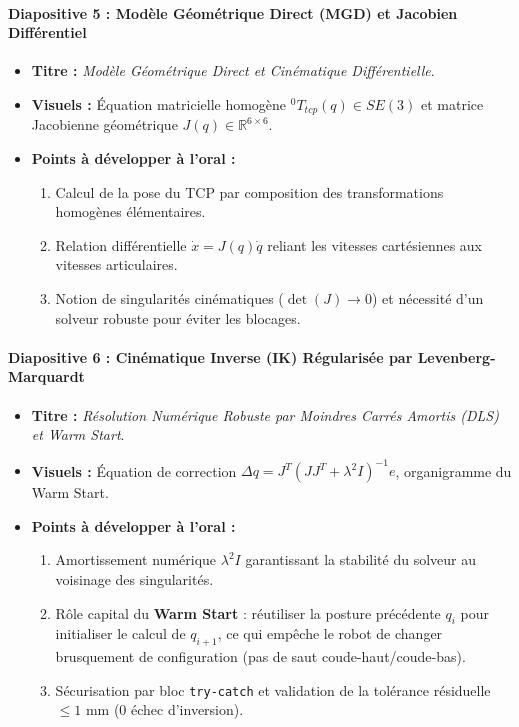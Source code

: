 \documentclass[11pt,a4paper]{report}
\begin{document}
\paragraph{Diapositive 5 : Modèle Géométrique Direct (MGD) et Jacobien Différentiel}
\begin{itemize}
    \item \textbf{Titre :} \textit{Modèle Géométrique Direct et Cinématique Différentielle}.
    \item \textbf{Visuels :} Équation matricielle homogène $^{0}T_{tcp}(q) \in SE(3)$ et matrice Jacobienne géométrique $J(q) \in \mathbb{R}^{6 \times 6}$.
    \item \textbf{Points à développer à l'oral :}
    \begin{enumerate}
        \item Calcul de la pose du TCP par composition des transformations homogènes élémentaires.
        \item Relation différentielle $\dot{x} = J(q) \dot{q}$ reliant les vitesses cartésiennes aux vitesses articulaires.
        \item Notion de singularités cinématiques ($\det(J) \to 0$) et nécessité d'un solveur robuste pour éviter les blocages.
    \end{enumerate}
\end{itemize}

\paragraph{Diapositive 6 : Cinématique Inverse (IK) Régularisée par Levenberg-Marquardt}
\begin{itemize}
    \item \textbf{Titre :} \textit{Résolution Numérique Robuste par Moindres Carrés Amortis (DLS) et Warm Start}.
    \item \textbf{Visuels :} Équation de correction $\Delta q = J^T(JJ^T + \lambda^2 I)^{-1} e$, organigramme du Warm Start.
    \item \textbf{Points à développer à l'oral :}
    \begin{enumerate}
        \item Amortissement numérique $\lambda^2 I$ garantissant la stabilité du solveur au voisinage des singularités.
        \item Rôle capital du \textbf{Warm Start} : réutiliser la posture précédente $q_i$ pour initialiser le calcul de $q_{i+1}$, ce qui empêche le robot de changer brusquement de configuration (pas de saut coude-haut/coude-bas).
        \item Sécurisation par bloc \texttt{try-catch} et validation de la tolérance résiduelle $\le 1\text{ mm}$ ($0$ échec d'inversion).
    \end{enumerate}
\end{itemize}
\end{document}
